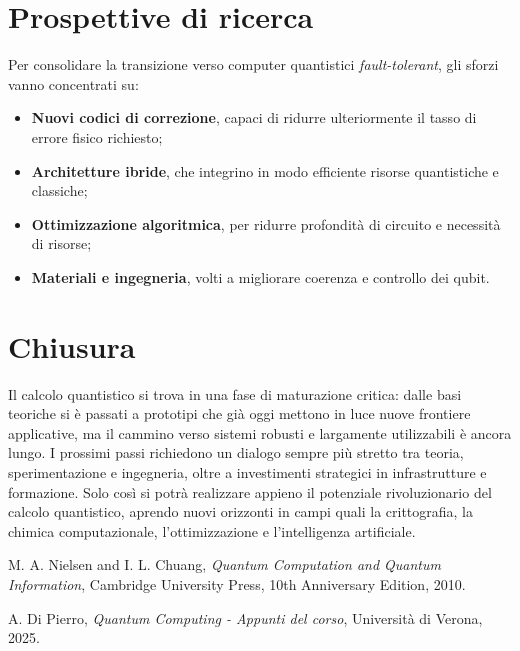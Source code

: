 \documentclass[a4paper,12pt]{report}
\theoremstyle{plain}
\begin{document}
\section*{Prospettive di ricerca}
Per consolidare la transizione verso computer quantistici \emph{fault-tolerant}, gli sforzi vanno concentrati su:
\begin{itemize}
    \item \textbf{Nuovi codici di correzione}, capaci di ridurre ulteriormente il tasso di errore fisico richiesto;
    \item \textbf{Architetture ibride}, che integrino in modo efficiente risorse quantistiche e classiche;
    \item \textbf{Ottimizzazione algoritmica}, per ridurre profondità di circuito e necessità di risorse;
    \item \textbf{Materiali e ingegneria}, volti a migliorare coerenza e controllo dei qubit.
\end{itemize}

\section*{Chiusura}
Il calcolo quantistico si trova in una fase di maturazione critica: dalle basi teoriche si è passati a prototipi che già oggi mettono in luce nuove frontiere applicative, ma il cammino verso sistemi robusti e largamente utilizzabili è ancora lungo. I prossimi passi richiedono un dialogo sempre più stretto tra teoria, sperimentazione e ingegneria, oltre a investimenti strategici in infrastrutture e formazione. Solo così si potrà realizzare appieno il potenziale rivoluzionario del calcolo quantistico, aprendo nuovi orizzonti in campi quali la crittografia, la chimica computazionale, l'ottimizzazione e l'intelligenza artificiale.

\begin{thebibliography}{9}

M. A. Nielsen and I. L. Chuang, \textit{Quantum Computation and Quantum Information}, Cambridge University Press, 10th Anniversary Edition, 2010.

A. Di Pierro, \textit{Quantum Computing - Appunti del corso}, Università di Verona, 2025.

\end{thebibliography}
\end{document}
